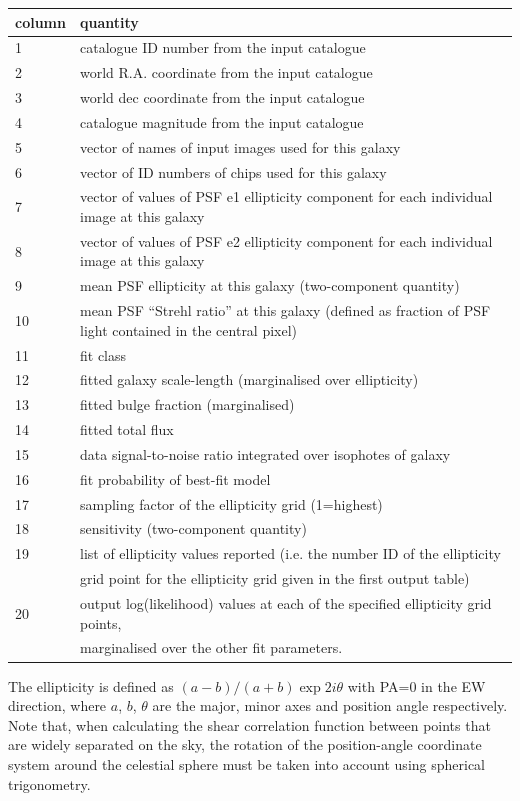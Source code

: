 \documentclass{article}
\begin{document}
\begin{tabular}{ll}
column & quantity \\
\hline
1 & catalogue ID number from the input catalogue \\
2 & world R.A. coordinate from the input catalogue \\
3 & world dec coordinate from the input catalogue \\
4 & catalogue magnitude from the input catalogue \\
5 & vector of names of input images used for this galaxy \\
6 & vector of ID numbers of chips used for this galaxy \\
7 & vector of values of PSF e1 ellipticity component for each individual image at this galaxy \\
8 & vector of values of PSF e2 ellipticity component for each individual image at this galaxy \\
9 & mean PSF ellipticity at this galaxy (two-component quantity) \\
10 & mean PSF ``Strehl ratio'' at this galaxy (defined as fraction of
PSF light contained in the central pixel) \\ 
11 & fit class \\
12 & fitted galaxy scale-length (marginalised over ellipticity) \\
13 & fitted bulge fraction (marginalised) \\
14 & fitted total flux \\
15 & data signal-to-noise ratio integrated over isophotes of galaxy \\
16 & fit probability of best-fit model \\
17 & sampling factor of the ellipticity grid (1=highest)\\
18 & sensitivity (two-component quantity)\\
19 & list of ellipticity values reported (i.e. the number ID of the ellipticity\\
 & grid point for the ellipticity grid given in the first output table)\\
20 & output log(likelihood) values at each of the specified
ellipticity grid points, \\
 & marginalised over the other fit parameters.\\
\end{tabular}

The ellipticity is defined as $(a-b)/(a+b)\exp{2 i \theta}$ with PA=0 in the EW
direction, where $a$, $b$, $\theta$ are the major, minor axes and position angle
respectively.  Note that, when calculating the shear correlation function between
points that are widely separated on the sky, the rotation of the position-angle
coordinate system around the celestial sphere must be taken into account using
spherical trigonometry.
\end{document}
